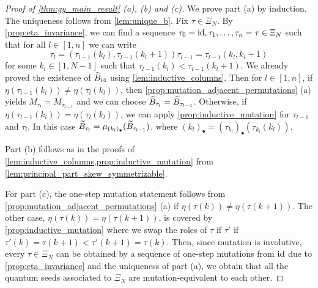 \begin{proof}[Proof of \cref{thm:gy_main_result} (a), (b) and (c)]
	We prove part (a) by induction. The uniqueness follows from \cref{lem:unique_b}. Fix $\tau \in \Xi_N$. By \cref{prop:eta_invariance}, we can find a sequence $\tau_0 = \operatorname{id}, \tau_1, \dots, \tau_n = \tau \in \Xi_N$ such that for all $l \in [1, n]$ we can write
	\begin{equation*}
		\tau_l = (\tau_{l-1}(k_l), \tau_{l-1}(k_l + 1))\tau_{l-1} = \tau_{l-1}(k_l, k_l + 1)
	\end{equation*}
	for some $k_l \in [1, N-1]$ such that $\tau_{l-1}(k_l) < \tau_{l-1}(k_l + 1)$. We
	already proved the existence of $\widetilde{B}_{\operatorname{id}}$ using \cref{lem:inductive_columns}. Then
	for $l \in [1, n]$, if $\eta(\tau_{l-1}(k_l)) \neq \eta(\tau_l(k_l))$, then
	\cref{prop:mutation_adjacent_permutations} (a) yields $M_{\tau_l} = M_{\tau_{l-1}}$ and
	we can choose $\widetilde{B}_{\tau_l} = \widetilde{B}_{\tau_{l-1}}$. Otherwise, if $\eta(\tau_{l-1}(k_l)) =
		\eta(\tau_l(k_l))$, we can apply \cref{prop:inductive_mutation} for $\tau_{l-1}$ and
	$\tau_{l}$. In this case $\widetilde{B}_{\tau_l} = \mu_{(k_l)_\bullet}(\widetilde{B}_{\tau_{l-1}})$, where
	$(k_l)_\bullet = (\tau_{k_l})_\bullet(\tau_{k_l}(k_l))$.

	Part (b) follows as in the proofs of
	\cref{lem:inductive_columns,prop:inductive_mutation} from
	\cref{lem:principal_part_skew_symmetrizable}.

	For part (c), the one-step mutation statement follows from
	\cref{prop:mutation_adjacent_permutations} (a) if $\eta(\tau(k)) \neq \eta(\tau(k +
			1))$. The other case, $\eta(\tau(k)) = \eta(\tau(k+1))$, is covered by
	\cref{prop:inductive_mutation} where we swap the roles of $\tau$ if $\tau'$ if
	$\tau'(k) = \tau(k + 1) < \tau'(k + 1) = \tau(k)$. Then, since mutation is involutive,
	every $\tau \in \Xi_N$ can be obtained by a sequence of one-step mutations from $\operatorname{id}$
	due to \cref{prop:eta_invariance} and the uniqueness of part (a), we obtain that all
	the quantum seeds associated to $\Xi_N$ are mutation-equivalent to each other.
\end{proof}


